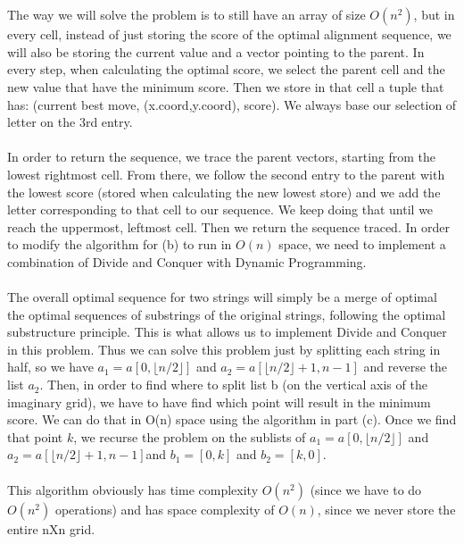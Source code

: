 \documentclass[12pt,twoside]{article}
\begin{document}
\begin{problems}
\begin{problemparts}
\\\\ The way we will solve the problem is to still have an array of size $O(n^2)$, but in every cell, instead of just storing the score of the optimal alignment sequence, we will also be storing the current value and a vector pointing to the parent. In every step, when calculating the optimal score, we select the parent cell and the new value that have the minimum score. Then we store in that cell a tuple that has: (current best move, (x.coord,y.coord), score). We always base our selection of letter on the 3rd entry.
\\\\In order to return the sequence, we trace the parent vectors, starting from the lowest rightmost cell. From there, we follow the second entry to the parent with the lowest score (stored when calculating the new lowest store) and we add the letter corresponding to that cell to our sequence. We keep doing that until we reach the uppermost, leftmost cell. Then we return the sequence traced.   
\problempart 
In order to modify the algorithm for (b) to run in $O(n)$ space, we need to implement a combination of Divide and Conquer with Dynamic Programming.
\\\\ The overall optimal sequence for two strings will simply be a merge of optimal the optimal sequences of substrings of the original strings, following the optimal substructure principle. This is what allows us to implement Divide and Conquer in this problem. Thus we can solve this problem just by splitting each string in half, so we have $a_1=a[0, \lfloor n/2 \rfloor ]$ and $a_2=a[ \lfloor n/2 \rfloor +1, n-1]$ and reverse the list $a_2$. Then, in order to find where to split list b (on the vertical axis of the imaginary grid), we have to have find which point will result in the minimum score. We can do that in O(n) space using the algorithm in part (c). Once we find that point $k$, we recurse the problem on the sublists of $a_1=a[0, \lfloor n/2 \rfloor ]$ and $a_2=a[ \lfloor n/2 \rfloor +1, n-1]$and $b_1=[0, k]$ and $b_2=[k,0]$.
\\\\ This algorithm obviously has time complexity $O(n^2)$ (since we have to do $O(n^2)$ operations) and has space complexity of $O(n)$, since we never store the entire nXn grid. 


\end{problemparts}
\end{problems}
\end{document}
